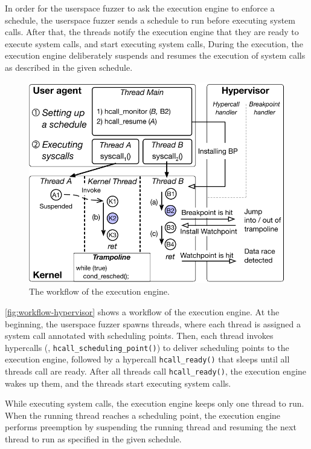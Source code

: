 %
In order for the userspace fuzzer to ask the execution engine to
enforce a schedule, the userspace fuzzer sends a schedule to run
before executing system calls.
%
After that, the threads notify the execution engine that they are
ready to execute system calls, and start executing system calls,
%
During the execution, the execution engine deliberately suspends and
resumes the execution of system calls as described in the given
schedule.

%
\begin{figure}[t]
  \centering
  \includegraphics[width=0.9\linewidth]{fig/workflow-hypervisor.pdf}
  \caption{The workflow of the execution engine. }
  \label{fig:workflow-hypervisor}
\end{figure}
%
\autoref{fig:workflow-hypervisor} shows a workflow of the execution
engine.
%
At the beginning, the userspace fuzzer spawns threads, where each
thread is assigned a system call annotated with scheduling points.
%
Then, each thread invokes hypercalls (\ie,
\texttt{hcall_scheduling_point()}) to deliver scheduling points to the
execution engine, followed by a hypercall \texttt{hcall_ready()} that
sleeps until all threads call are ready.
%
After all threads call \texttt{hcall_ready()}, the execution engine
wakes up them, and the threads start executing system calls.


While executing system calls, the execution engine keeps only one
thread to run.
%
When the running thread reaches a scheduling point, the execution
engine performs preemption by suspending the running thread and
resuming the next thread to run as specified in the given schedule.



